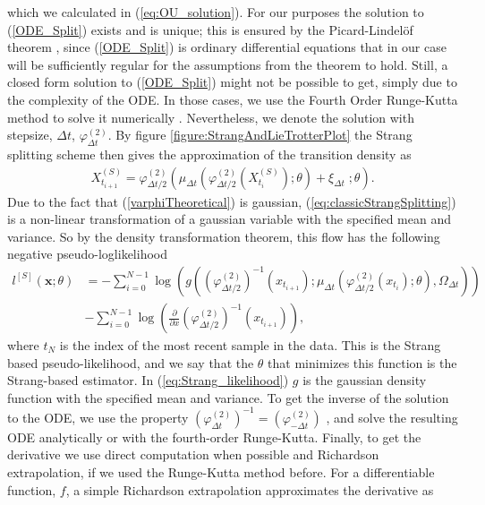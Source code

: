which we calculated in (\ref{eq:OU_solution}). For our purposes the solution to (\ref{ODE_Split}) exists and is unique; this is ensured by the Picard-Lindelöf theorem \cite[section 2.7]{Srkk2019}, since (\ref{ODE_Split}) is ordinary differential equations that in our case will be sufficiently regular for the assumptions from the theorem to hold. Still, a closed form solution to (\ref{ODE_Split}) might not be possible to get, simply due to the complexity of the ODE. In those cases, we use the Fourth Order Runge-Kutta method to solve it numerically \cite[p.541 equation (8)]{numericalAnalysis}.  
Nevertheless, we denote the solution with stepsize, $\Delta t$, $\varphi_{\Delta t}^{(2)}$. By figure \ref{figure:StrangAndLieTrotterPlot} the Strang splitting scheme then gives the approximation of the transition density as 
\begin{align}
    X_{t_{i+1}}^{(S)} = \varphi_{\Delta t / 2}^{(2)}\left(\mu_{\Delta t}\left(\varphi_{\Delta t/2}^{(2)}\left(X_{t_{i}}^{(S)}\right); \theta\right) + \xi_{\Delta t} \; ; \theta \right). \label{eq:classicStrangSplitting}
\end{align}
Due to the fact that (\ref{varphiTheoretical}) is gaussian, (\ref{eq:classicStrangSplitting}) is a non-linear transformation of a gaussian variable with the specified mean and variance. So by the density transformation theorem, this flow has the following negative pseudo-loglikelihood 
\begin{align}
    l^{[S]}(\mathbf{x}; \theta) &= -\sum_{i = 0}^{N - 1}\log\left(g\left(\left(\varphi_{\Delta t / 2}^{(2)}\right)^{-1}\left(x_{t_{i+1}}\right); \mu_{\Delta t}\left(\varphi_{\Delta t/2}^{(2)}\left(x_{t_{i}}\right); \theta \right), \Omega_{\Delta t} \right) \right) \nonumber \\
    &- \sum_{i = 0}^{N - 1}\log\left(\frac{\partial}{\partial x}\left(\varphi_{\Delta t / 2}^{(2)}\right)^{-1}\left(x_{t_{i + 1}}\right) \right), \label{eq:Strang_likelihood}
\end{align}
where $t_N$ is the index of the most recent sample in the data. This is the Strang based pseudo-likelihood, and we say that the $\theta$ that minimizes this function is the Strang-based estimator. In (\ref{eq:Strang_likelihood}) $g$ is the gaussian density function with the specified mean and variance. 
To get the inverse of the solution to the ODE, we use the property $\left(\varphi_{\Delta t}^{(2)}\right)^{-1} = \left(\varphi_{-\Delta t}^{(2)}\right)$ \cite[Remark below equation (9)]{SplittingSchemes}, and solve the resulting ODE analytically or with the fourth-order Runge-Kutta. Finally, to get the derivative we use direct computation when possible and Richardson extrapolation, if we used the Runge-Kutta method before. For a differentiable function, $f$, a simple Richardson extrapolation approximates the derivative as
